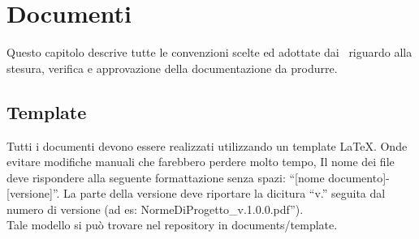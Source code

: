 \section{Documenti}{
Questo capitolo descrive tutte le convenzioni scelte ed adottate dai \gruppo\ riguardo alla stesura, verifica e approvazione della documentazione da produrre.
\subsection{Template} 
		Tutti i documenti devono essere realizzati utilizzando un template \LaTeX. Onde evitare modifiche manuali che farebbero perdere molto tempo, 
		Il nome dei file deve rispondere alla seguente formattazione senza spazi: “[nome documento]-[versione]”. La parte della versione deve riportare la dicitura “v.” seguita dal numero di versione (ad es: NormeDiProgetto\_v.1.0.0.pdf”).\\
 		Tale modello si può trovare nel repository in documents/template.
	\label{sec:docs}
}
